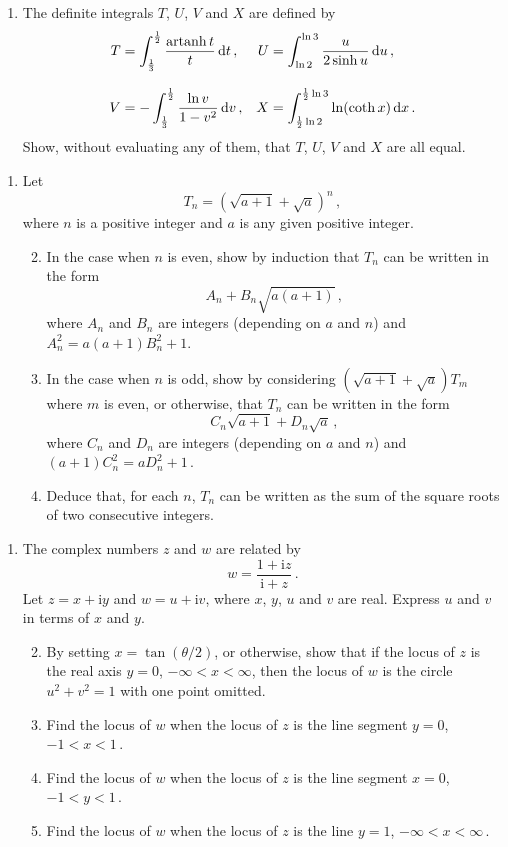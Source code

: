 \documentclass[a4, 11pt]{report}
\newlength{\qspace}
\newcounter{qnumber}
\newenvironment{question}%
 {\vspace{\qspace}
  \begin{enumerate}[\bfseries 1\quad][10]%
    \setcounter{enumi}{\value{qnumber}}%
    \item%
 }
{
  \end{enumerate}
  \filbreak
  \stepcounter{qnumber}
 }
\newenvironment{questionparts}[1][1]%
 {
  \begin{enumerate}[\bfseries (i)]%
    \setcounter{enumii}{#1}
    \addtocounter{enumii}{-1}
    \setlength{\itemsep}{5mm}
    \setlength{\parskip}{8pt}
 }
 {
  \end{enumerate}
 }
\def\d{{\mathrm d}}
\begin{document}
\begin{question}
The definite integrals $T$, $U$, $V$ and $X$ are defined by
\begin{align*}
T&= \int_{\frac13}^{\frac12} \frac{{\rm artanh}\, t}t \,\d t\,, & 
U&=  \int _{\ln 2 }^{\ln 3 } \frac{u}{2\sinh u}\, \d u \,, \\[3mm]
V&= - \int_{\frac13}^{\frac12} \frac{\ln v}{1-v^2} \,\d v \,, &
X&=  \int _{\frac12\ln2}^{\frac12\ln3} \ln ({\coth x})\, \d x\,.
\end{align*}
Show, without evaluating any of them, that $T$, $U$, $V$ and $X$ are
all equal.
\end{question}
		
\begin{question}
Let
\[
T _n    = 
\left( \sqrt{a+1} + \sqrt a\right)^n\,,
\]
where $n$ is a positive integer and $a$ is any given positive integer.
\begin{questionparts}
\item
In the case when $n$ is even, show
 by induction  that  
$T_n$ can be written in the form
\[
A_n +B_n \sqrt{a(a+1)}\,,
\]
 where
$A_n$ and $B_n$ are integers (depending on $a$ and $n$)
and $A_n^2 =a(a+1)B_n^2 +1$.

\item In the case when $n$ is odd, show by considering
$(\sqrt{a+1} +\sqrt a)T_m$ where $m$ is even, or otherwise,
that  $T_n$ 
can be written in the form
\[
C_n \sqrt {a+1} + D_n \sqrt a \,,
\]
where $C_n$ and $D_n$ are integers (depending on $a$ and $n$) and 
$ (a+1)C_n^2 = a D_n^2 +1\,$.

\item Deduce that, for each $n$, $T_n$ can be written
as the sum of the square roots of two consecutive integers.

\end{questionparts}
\end{question}	

\begin{question}
The complex numbers $z$ and $w$ are related by
\[
w= \frac{1+\mathrm{i}z}{\mathrm{i}+z}\,.
\]
Let $z=x+\mathrm{i}y$ and $w=u+\mathrm{i}v$, 
where $x$, $y$, $u$ and $v$ are real. 
Express $u$ and $v$ in terms of $x$ and $y$.
\begin{questionparts}
\item 
By setting $x=\tan(\theta/2)$, or otherwise,
show that if the locus of $z$ is the real axis $y=0$, $-\infty<x<\infty$,
then the locus of $w$ is the circle $u^2+v^2=1$ with one point
omitted.
\item Find the locus of $w$ when the locus of $z$ is 
the line segment $y=0$, $-1<x<1\,$.
\item Find the locus of $w$ when the locus of $z$ is 
the line segment $x=0$, $-1<y<1\,$.
\item Find the locus of $w$ when the locus of $z$ is 
the line $y=1$, $-\infty<x<\infty\,$. 
\end{questionparts}
\end{question}	
		
\end{document}
